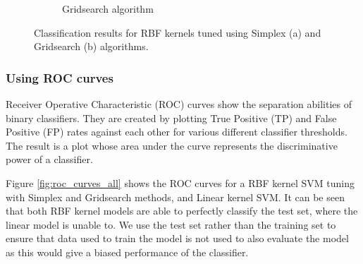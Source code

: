 \documentclass{article}
\begin{document}
\begin{figure}[h]
\begin{subfigure}[b]{0.4\textwidth}
                    \caption{Gridsearch algorithm}
                     \label{fig:rbf_gridsearch_tuned}
                 \end{subfigure}
                 \hspace{0.05\textwidth}
                \caption{Classification results for RBF kernels tuned using Simplex (a) and Gridsearch (b) algorithms.}
                \label{fig:searchmethods}
            \end{figure}
            
        \subsubsection{Using ROC curves}
            Receiver Operative Characteristic (ROC) curves show the separation abilities of binary classifiers. They are created by plotting True Positive (TP) and False Positive (FP) rates against each other for various different classifier thresholds. The result is a plot whose area under the curve represents the discriminative power of a classifier. 
            
            Figure \ref{fig:roc_curves_all} shows the ROC curves for a RBF kernel SVM tuning with Simplex and Gridsearch methods, and Linear kernel SVM. It can be seen that both RBF kernel models are able to perfectly classify the test set, where the linear model is unable to. We use the test set rather than the training set to ensure that data used to train the model is not used to also evaluate the model as this would give a biased performance of the classifier. 
            
\end{document}
